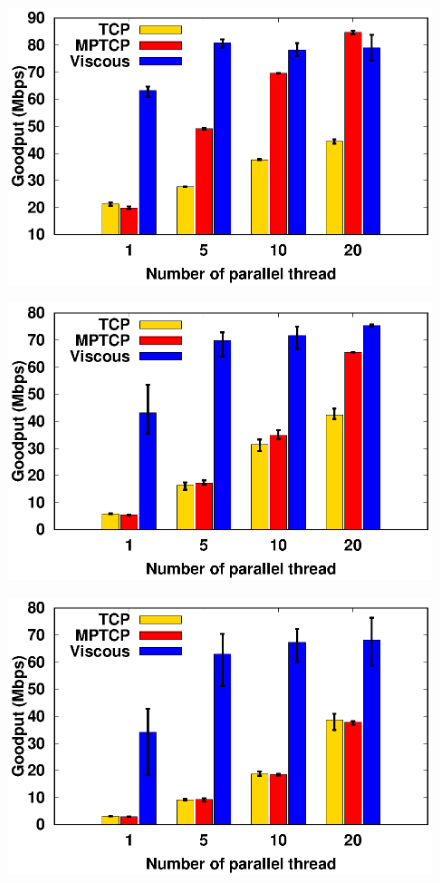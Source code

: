 \begin{figure}[!t]
	\begin{center}
		\begin{minipage}{0.45\linewidth}
			\centering
			\includegraphics[width=\linewidth]{img/exp7/goodput_1}
			\label{fig:exp7_goodput_16}
		\end{minipage}
		\begin{minipage}{0.45\linewidth}
			\centering
			\includegraphics[width=\linewidth]{img/exp7/goodput_5}
			\label{fig:exp7_goodput_80}
		\end{minipage}
		\begin{minipage}{0.45\linewidth}
			\centering
			\includegraphics[width=\linewidth]{img/exp7/goodput_10}

\end{minipage}
\end{center}
\end{figure}
